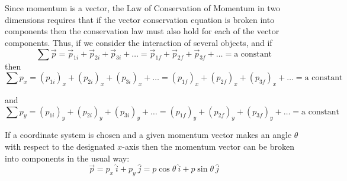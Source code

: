 Since momentum is a vector, the Law of Conservation of Momentum in two dimensions
requires that if the vector conservation equation is broken into components
then the conservation law must also hold for each of the vector components.
Thus, if we consider the interaction of several objects, and if 
\[
\sum {\vec p}={{\vec p}_{1i}}+{{\vec p}_{2i}}+{{\vec p}_{3i}}+\ldots ={{\vec p}_{1f}}+{{\vec p}_{2f}}+{{\vec p}_{3f}}+\ldots =\mbox{a constant}\]
then
\[
\sum p_{x}=(p_{1i})_{x}+(p_{2i})_{x}+(p_{3i})_{x}+\ldots = (p_{1f})_{x}+(p_{2f})_{x}+(p_{3f})_{x}+\ldots =
\mbox{a constant}\]


and
\[
\sum p_{y}=(p_{1i})_{y}+(p_{2i})_{y}+(p_{3i})_{y}+\ldots = (p_{1f})_{y}+(p_{2f})_{y}+(p_{3f})_{y}+\ldots =
\mbox{a constant}\]


If a coordinate system is chosen and a given momentum vector makes an angle
\( \theta  \) with respect to the designated $x$-axis then the momentum vector
can be broken into components in the usual way:
\[
{\vec p}=p_{x}~\widehat{i}+p_{y}~\widehat{ j}=p\cos \theta~\widehat{ i}+
p\sin \theta~\widehat{ j}\]









